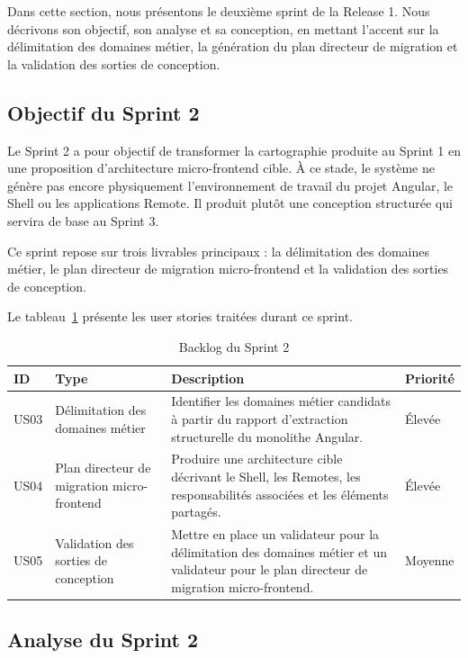 Dans cette section, nous présentons le deuxième sprint de la Release 1. Nous décrivons son objectif, son analyse et sa conception, en mettant l'accent sur la délimitation des domaines métier, la génération du plan directeur de migration et la validation des sorties de conception.

\subsection{Objectif du Sprint 2}

Le Sprint 2 a pour objectif de transformer la cartographie produite au Sprint 1 en une proposition d'architecture micro-frontend cible. À ce stade, le système ne génère pas encore physiquement l'environnement de travail du projet Angular, le Shell ou les applications Remote. Il produit plutôt une conception structurée qui servira de base au Sprint 3.

Ce sprint repose sur trois livrables principaux : la délimitation des domaines métier, le plan directeur de migration micro-frontend et la validation des sorties de conception.

Le tableau~\ref{tab:backlog-sprint2-release1} présente les user stories traitées durant ce sprint.

\begingroup
\renewcommand{\arraystretch}{1.12}
\setlength{\tabcolsep}{4pt}
\begin{longtable}{|p{1.0cm}|p{3.4cm}|p{7.0cm}|p{1.15cm}|}
\caption{Backlog du Sprint 2}\label{tab:backlog-sprint2-release1}\\
\hline
\textbf{ID} & \textbf{Type} & \textbf{Description} & \textbf{Priorité} \\
\hline
US03 & Délimitation des domaines métier & Identifier les domaines métier candidats à partir du rapport d'extraction structurelle du monolithe Angular. & Élevée \\
\hline
US04 & Plan directeur de migration micro-frontend & Produire une architecture cible décrivant le Shell, les Remotes, les responsabilités associées et les éléments partagés. & Élevée \\
\hline
US05 & Validation des sorties de conception & Mettre en place un validateur pour la délimitation des domaines métier et un validateur pour le plan directeur de migration micro-frontend. & Moyenne \\
\hline
\end{longtable}
\endgroup

\subsection{Analyse du Sprint 2}

